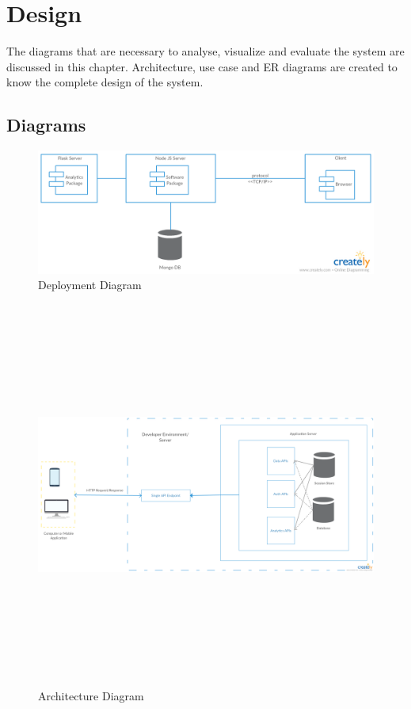 \documentclass[a4paper,12pt]{report}
\begin{document}
    \chapter {Design}    
    The diagrams that are necessary to analyse, visualize and evaluate the system are discussed in this chapter. Architecture, use case and ER diagrams are created to know the complete design of the system.
    \section{Diagrams}          

        \begin{figure}[h] \centering
          \includegraphics[width=1\textwidth]{images/Deployment.png}
          \caption{ Deployment Diagram}  
        \end{figure}
                
        \begin{figure}[h] \centering
          \includegraphics[width=9.0in, height=5.0in ,angle=90]{images/Architecture-Diagram.png}
        \caption{ Architecture Diagram}  
        \end{figure}
\end{document}
